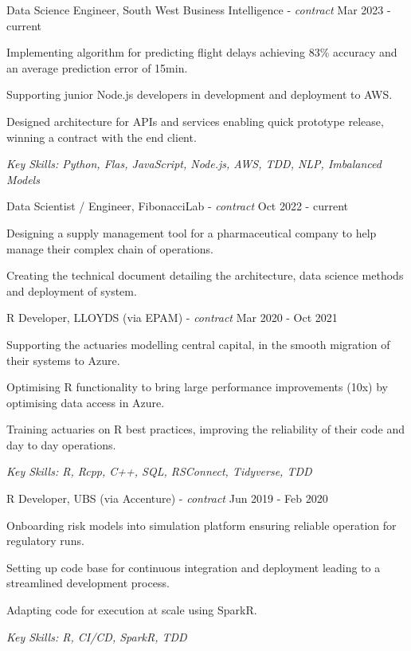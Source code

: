 \documentclass[11pt,article,oneside]{memoir}
\newenvironment{itemize*}{%
  \renewcommand\labelitemi{\textbullet}
  \footnotesize
  \begin{itemize}%
    \setlength{\itemsep}{0pt}}%
  {\end{itemize}
}
\begin{document}
\normalsize
\medskip
\ind Data Science Engineer, South West Business Intelligence - \emph{contract} \hfill Mar 2023 - current
\begin{itemize*}
    \item Implementing algorithm for predicting flight delays achieving 83\% accuracy and an average prediction error of 15min.
    \item Supporting junior Node.js developers in development and deployment to AWS. 
    \item Designed architecture for APIs and services enabling quick prototype release, winning a contract with the end client.
\end{itemize*}
\ind \hspace{0.35in} \footnotesize \emph{Key Skills: Python, Flas, JavaScript, Node.js, AWS, TDD, NLP, Imbalanced Models}

\normalsize
\medskip
\ind Data Scientist / Engineer, FibonacciLab - \emph{contract} \hfill Oct 2022 - current
\begin{itemize*}
    \item Designing a supply management tool for a pharmaceutical company to help manage their complex chain of operations.
    \item Creating the technical document detailing the architecture, data science methods and deployment of system. 
\end{itemize*}

\normalsize
\medskip
\ind R Developer, LLOYDS (via EPAM) - \emph{contract} \hfill Mar 2020 - Oct 2021
\begin{itemize*}
    \item Supporting the actuaries modelling central capital, in the smooth migration of their systems to Azure.
    \item Optimising R functionality to bring large performance improvements (10x) by optimising data access in Azure. 
    \item Training actuaries on R best practices, improving the reliability of their code and day to day operations.
\end{itemize*}
\ind \hspace{0.35in} \footnotesize \emph{Key Skills: R, Rcpp, C++, SQL, RSConnect, Tidyverse, TDD}

\normalsize
\medskip
\ind R Developer, UBS (via Accenture) - \emph{contract} \hfill Jun 2019 - Feb 2020
\begin{itemize*}
    \item Onboarding risk models into simulation platform ensuring reliable operation for regulatory runs.
    \item Setting up code base for continuous integration and deployment leading to a streamlined development process.
    \item Adapting code for execution at scale using SparkR.
\end{itemize*}
\ind \hspace{0.35in} \footnotesize \emph{Key Skills: R, CI/CD, SparkR, TDD}
\end{document}
